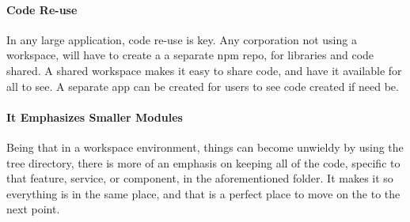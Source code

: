 \paragraph{Code Re-use}
In any large application, code re-use is key. Any corporation not using a
workspace, will have to create a a separate npm repo, for libraries and code
shared. A shared workspace makes it easy to share code, and have it available
for all to see. A separate app can be created for users to see code created if
need be.

\paragraph{It Emphasizes Smaller Modules}
Being that in a workspace environment, things can become unwieldy by using the
tree directory, there is more of an emphasis on keeping all of the code,
specific to that feature, service, or component, in the aforementioned folder.
It makes it so everything is in the same place, and that is a perfect place to
move on the to the next point. 

